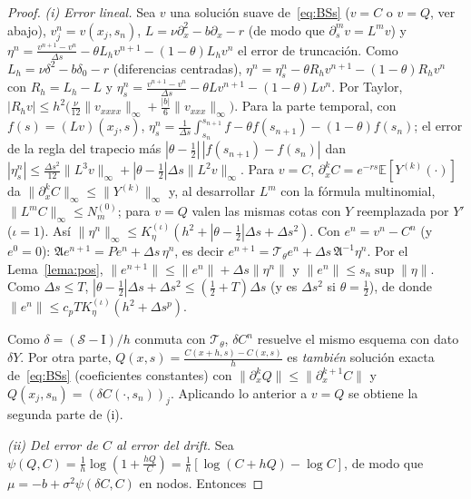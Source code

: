 \documentclass[11pt,letterpaper]{article}
\theoremstyle{plain}
\theoremstyle{definition}
\theoremstyle{remark}
\numberwithin{equation}{section}
\newcommand{\E}{\mathbb{E}}
\newcommand{\norm}[1]{\lVert #1\rVert}
\newcommand{\Sh}{\mathcal{S}}
\newcommand{\Id}{\mathrm{I}}
\newcommand{\Top}{\mathcal{T}}
\begin{document}
	\begin{proof}
		\emph{(i) Error lineal.} Sea \(v\) una solución suave de~\eqref{eq:BSs} (\(v=C\) o \(v=Q\), ver abajo), \(v^n_j=v(x_j,s_n)\), \(L=\nu\partial_x^2-b\partial_x-r\) (de modo que \(\partial_s^mv=L^mv\)) y \(\eta^n=\frac{v^{n+1}-v^n}{\Delta s}-\theta L_hv^{n+1}-(1-\theta)L_hv^n\) el error de truncación. Como \(L_h=\nu\delta^2-b\delta_0-r\) (diferencias centradas), \(\eta^n=\eta^n_s-\theta R_hv^{n+1}-(1-\theta)R_hv^n\) con \(R_h=L_h-L\) y \(\eta^n_s=\frac{v^{n+1}-v^n}{\Delta s}-\theta Lv^{n+1}-(1-\theta)Lv^n\). Por Taylor, \(|R_hv|\le h^2\bigl(\frac\nu{12}\norm{v_{xxxx}}_\infty+\frac{|b|}6\norm{v_{xxx}}_\infty\bigr)\). Para la parte temporal, con \(f(s)=(Lv)(x_j,s)\), \(\eta^n_s=\frac1{\Delta s}\int_{s_n}^{s_{n+1}}f-\theta f(s_{n+1})-(1-\theta)f(s_n)\); el error de la regla del trapecio más \(|\theta-\frac12|\,|f(s_{n+1})-f(s_n)|\) dan \(|\eta^n_s|\le\frac{\Delta s^2}{12}\norm{L^3v}_\infty+|\theta-\frac12|\Delta s\norm{L^2v}_\infty\). Para \(v=C\), \(\partial_x^kC=e^{-rs}\E[Y^{(k)}(\cdot)]\) da \(\norm{\partial_x^kC}_\infty\le\norm{Y^{(k)}}_\infty\) y, al desarrollar \(L^m\) con la fórmula multinomial, \(\norm{L^mC}_\infty\le N_m^{(0)}\); para \(v=Q\) valen las mismas cotas con \(Y\) reemplazada por \(Y'\) (\(\iota=1\)). Así \(\norm{\eta^n}_\infty\le K_\eta^{(\iota)}(h^2+|\theta-\frac12|\Delta s+\Delta s^2)\). Con \(e^n=v^n-C^n\) (y \(e^0=0\)): \(\mathfrak Ae^{n+1}=Pe^n+\Delta s\,\eta^n\), es decir \(e^{n+1}=\Top_\theta e^n+\Delta s\,\mathfrak A^{-1}\eta^n\). Por el Lema~\ref{lema:pos}, \(\norm{e^{n+1}}\le\norm{e^n}+\Delta s\norm{\eta^n}\) y \(\norm{e^n}\le s_n\sup\norm{\eta}\). Como \(\Delta s\le T\), \(|\theta-\frac12|\Delta s+\Delta s^2\le(\frac12+T)\Delta s\) (y es \(\Delta s^2\) si \(\theta=\frac12\)), de donde \(\norm{e^n}\le c_pTK_\eta^{(\iota)}(h^2+\Delta s^p)\).
		
		Como \(\delta=(\Sh-\Id)/h\) conmuta con \(\Top_\theta\), \(\delta C^n\) resuelve el mismo esquema con dato \(\delta Y\). Por otra parte, \(Q(x,s)=\frac{C(x+h,s)-C(x,s)}{h}\) es \emph{también} solución exacta de~\eqref{eq:BSs} (coeficientes constantes) con \(\norm{\partial^k_xQ}\le\norm{\partial_x^{k+1}C}\) y \(Q(x_j,s_n)=(\delta C(\cdot,s_n))_j\). Aplicando lo anterior a \(v=Q\) se obtiene la segunda parte de (i).
		
		\emph{(ii) Del error de \(C\) al error del drift.} Sea \(\psi(Q,C)=\frac1h\log\left(1+\frac{hQ}{C}\right)=\frac1h\left[\log(C+hQ)-\log C\right]\), de modo que \(\mu=-b+\sigma^2\psi(\delta C,C)\) en nodos. Entonces
		

\end{proof}
\end{document}
